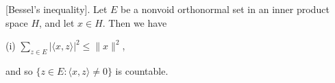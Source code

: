 [Bessel's inequality]. Let $E$ be a nonvoid orthonormal set in an inner product space $H$, and let $x \in H$. Then we have

(i) $\sum_{z \in E} |\langle x, z \rangle|^2 \leq \|x\|^2$,

and so $\{z \in E : \langle x, z \rangle \neq 0\}$ is countable.
